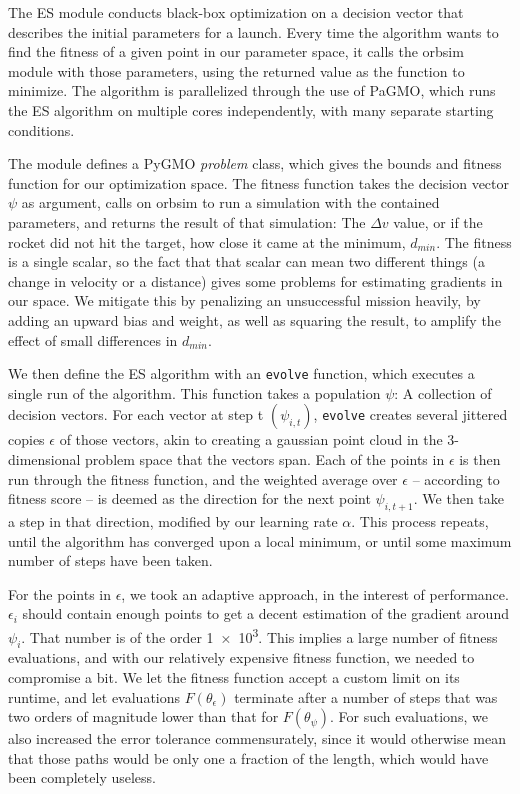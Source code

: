 

The ES module conducts black-box optimization on a decision vector that describes the initial parameters for a launch. Every time the algorithm wants to find the fitness of a given point in our parameter space, it calls the orbsim module with those parameters, using the returned value as the function to minimize. The algorithm is parallelized through the use of PaGMO, which runs the ES algorithm on multiple cores independently, with many separate starting conditions.

The module defines a PyGMO \emph{problem} class, which gives the bounds and fitness function for our optimization space. The fitness function takes the decision vector \(\psi\) as argument, calls on orbsim to run a simulation with the contained parameters, and returns the result of that simulation: The \(\Delta v\) value, or if the rocket did not hit the target, how close it came at the minimum, \(d_{min}\). The fitness is a single scalar, so the fact that that scalar can mean two different things (a change in velocity or a distance) gives some problems for estimating gradients in our space. We mitigate this by penalizing an unsuccessful mission heavily, by adding an upward bias and weight, as well as squaring the result, to amplify the effect of small differences in \(d_{min}\).

We then define the ES algorithm with an \texttt{evolve} function, which executes a single run of the algorithm. This function takes a population \(\psi\): A collection of decision vectors. For each vector at step t \((\psi_{i,t})\), \texttt{evolve} creates several jittered copies \(\epsilon\) of those vectors, akin to creating a gaussian point cloud in the 3-dimensional problem space that the vectors span. Each of the points in \(\epsilon\) is then run through the fitness function, and the weighted average over \(\epsilon\) -- according to fitness score -- is deemed as the direction for the next point \(\psi_{i,t+1}\). We then take a step in that direction, modified by our learning rate \(\alpha\). This process repeats, until the algorithm has converged upon a local minimum, or until some maximum number of steps have been taken.

For the points in \(\epsilon\), we took an adaptive approach, in the interest of performance. \(\epsilon_i\) should contain enough points to get a decent estimation of the gradient around \(\psi_i\). That number is of the order \num{1e3}. This implies a large number of fitness evaluations, and with our relatively expensive fitness function, we needed to compromise a bit. We let the fitness function accept a custom limit on its runtime, and let evaluations \(F(\theta_\epsilon)\) terminate after a number of steps that was two orders of magnitude lower than that for \(F(\theta_\psi)\). For such evaluations, we also increased the error tolerance commensurately, since it would otherwise mean that those paths would be only one a fraction of  the length, which would have been completely useless.

